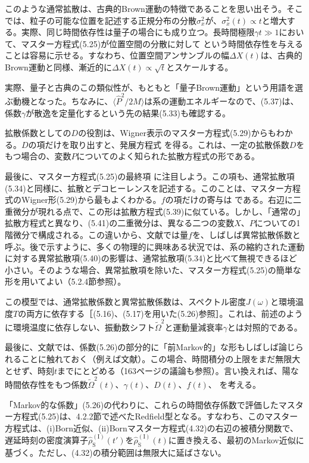 このような通常拡散は、古典的Brown運動の特徴であることを思い出そう。そこでは、粒子の可能な位置を記述する正規分布の分散$\sigma_x^2$が、$\sigma_x^2(t)\propto t$と増大する。実際、同じ時間依存性は量子の場合にも成り立つ。長時間極限$\gamma t\gg1$において、マスター方程式(5.25)が位置空間の分散に対して
という時間依存性を与えることは容易に示せる。すなわち、位置空間アンサンブルの幅$\Delta X(t)$は、古典的Brown運動と同様、漸近的に$\Delta X(t)\propto\sqrt t$とスケールする。

\hypertarget{srcpage:186}{}\label{srcpage:186}
実際、量子と古典のこの類似性が、もともと「量子Brown運動」という用語を選ぶ動機となった。ちなみに、$\langle\hat P^2/2M\rangle$は系の運動エネルギーなので、(5.37)は、係数$\gamma$が散逸を定量化するという先の結果(5.33)も確認する。

拡散係数としての$D$の役割は、Wigner表示のマスター方程式(5.29)からもわかる。$D$の項だけを取り出すと、発展方程式
を得る。これは、一定の拡散係数$D$をもつ場合の、変数$P$についてのよく知られた拡散方程式の形である。

最後に、マスター方程式(5.25)の最終項
に注目しよう。この項も、通常拡散項(5.34)と同様に、拡散とデコヒーレンスを記述する。このことは、マスター方程式のWigner形(5.29)から最もよくわかる。$f$の項だけの寄与は
である。右辺に二重微分が現れる点で、この形は拡散方程式(5.39)に似ている。しかし、「通常の」拡散方程式と異なり、(5.41)の二重微分は、異なる二つの変数$X$、$P$についての1階微分で構成される。この違いから、文献では量$f$を、しばしば異常拡散係数と呼ぶ。後で示すように、多くの物理的に興味ある状況では、系の縮約された運動に対する異常拡散項(5.40)の影響は、通常拡散項(5.34)と比べて無視できるほど小さい。そのような場合、異常拡散項を除いた、マスター方程式(5.25)の簡単な形を用いてよい（5.2.4節参照）。

この模型では、通常拡散係数と異常拡散係数は、スペクトル密度$J(\omega)$と環境温度$T$の両方に依存する［(5.16)、(5.17)を用いた(5.26)参照］。これは、前述のように環境温度に依存しない、振動数シフト$\widetilde\Omega^2$と運動量減衰率$\gamma$とは対照的である。

最後に、文献では、係数(5.26)の部分的に「前Markov的」な形もしばしば論じられることに触れておく（例えば文献\cite{ref015,ref016}）。この場合、時間積分の上限をまだ無限大とせず、時刻$t$までにとどめる（163ページの議論も参照）。言い換えれば、陽な時間依存性をもつ係数$\widetilde\Omega^2(t)$、$\gamma(t)$、$D(t)$、$f(t)$、
を考える。

\hypertarget{srcpage:187}{}\label{srcpage:187}
「Markov的な係数」(5.26)の代わりに、これらの時間依存係数で評価したマスター方程式(5.25)は、4.2.2節で述べたRedfield型\cite{ref174,ref175}となる。すなわち、このマスター方程式は、(i)Born近似、(ii)Bornマスター方程式(4.32)の右辺の被積分関数で、遅延時刻の密度演算子$\hat\rho^{(\mathrm I)}_{\mathrm S}(t')$を$\hat\rho^{(\mathrm I)}_{\mathrm S}(t)$に置き換える、最初のMarkov近似に基づく。ただし、(4.32)の積分範囲は無限大に延ばさない。

